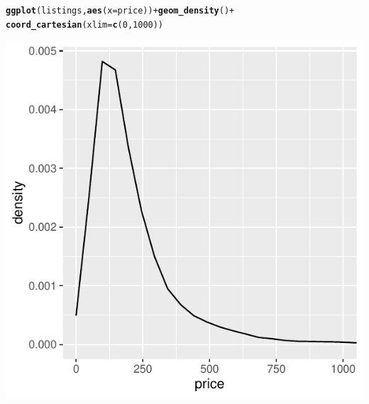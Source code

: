 \documentclass[a4paper, justified]{tufte-handout}\usepackage[]{graphicx}\usepackage[]{xcolor}
\makeatletter
\def\maxwidth{ %
  \ifdim\Gin@nat@width>\linewidth
    \linewidth
  \else
    \Gin@nat@width
  \fi
}
\newcommand{\hlnum}[1]{\textcolor[rgb]{0.686,0.059,0.569}{#1}}%
\newcommand{\hlopt}[1]{\textcolor[rgb]{0,0,0}{#1}}%
\newcommand{\hlstd}[1]{\textcolor[rgb]{0.345,0.345,0.345}{#1}}%
\newcommand{\hlkwc}[1]{\textcolor[rgb]{0.333,0.667,0.333}{#1}}%
\newcommand{\hlkwd}[1]{\textcolor[rgb]{0.737,0.353,0.396}{\textbf{#1}}}%
\newenvironment{kframe}{%
 \def\at@end@of@kframe{}%
 \ifinner\ifhmode%
  \def\at@end@of@kframe{\end{minipage}}%
  \begin{minipage}{\columnwidth}%
 \fi\fi%
 \def\FrameCommand##1{\hskip\@totalleftmargin \hskip-\fboxsep
 \colorbox{shadecolor}{##1}\hskip-\fboxsep
     \hskip-\linewidth \hskip-\@totalleftmargin \hskip\columnwidth}%
 \MakeFramed {\advance\hsize-\width
   \@totalleftmargin\z@ \linewidth\hsize
   \@setminipage}}%
 {\par\unskip\endMakeFramed%
 \at@end@of@kframe}
\newenvironment{knitrout}{}{} %
\makeatother
\begin{document}
\begin{knitrout}
\color{fgcolor}\begin{kframe}
\begin{alltt}
\hlkwd{ggplot}\hlstd{(listings,} \hlkwd{aes}\hlstd{(}\hlkwc{x} \hlstd{= price))} \hlopt{+} \hlkwd{geom_density}\hlstd{()} \hlopt{+}
    \hlkwd{coord_cartesian}\hlstd{(}\hlkwc{xlim} \hlstd{=} \hlkwd{c}\hlstd{(}\hlnum{0}\hlstd{,} \hlnum{1000}\hlstd{))}
\end{alltt}
\end{kframe}\begin{marginfigure}
\includegraphics[width=\maxwidth]{figure/graphTest-1} \caption[ ]{ }\label{fig:graphTest}
\end{marginfigure}

\end{knitrout}
\end{document}
